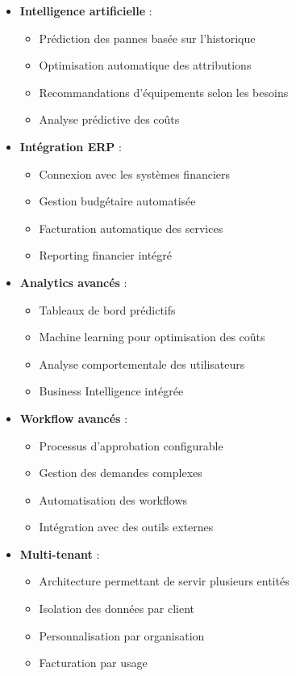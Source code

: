 \documentclass[12pt,a4paper]{report}
\begin{document}
\begin{itemize}

\item \textbf{Intelligence artificielle} : 
  \begin{itemize}
  \item Prédiction des pannes basée sur l'historique
  \item Optimisation automatique des attributions
  \item Recommandations d'équipements selon les besoins
  \item Analyse prédictive des coûts
  \end{itemize}

\item \textbf{Intégration ERP} : 
  \begin{itemize}
  \item Connexion avec les systèmes financiers
  \item Gestion budgétaire automatisée
  \item Facturation automatique des services
  \item Reporting financier intégré
  \end{itemize}

\item \textbf{Analytics avancés} : 
  \begin{itemize}
  \item Tableaux de bord prédictifs
  \item Machine learning pour optimisation des coûts
  \item Analyse comportementale des utilisateurs
  \item Business Intelligence intégrée
  \end{itemize}

\item \textbf{Workflow avancés} : 
  \begin{itemize}
  \item Processus d'approbation configurable
  \item Gestion des demandes complexes
  \item Automatisation des workflows
  \item Intégration avec des outils externes
  \end{itemize}

\item \textbf{Multi-tenant} : 
  \begin{itemize}
  \item Architecture permettant de servir plusieurs entités
  \item Isolation des données par client
  \item Personnalisation par organisation
  \item Facturation par usage
  \end{itemize}
\end{itemize}
\end{document}
